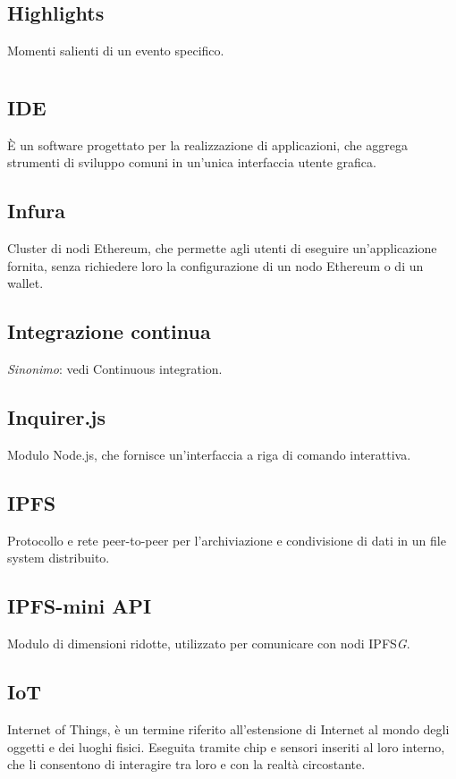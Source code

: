 	\subsection*{Highlights}
	Momenti salienti di un evento specifico. 
\pagebreak
\section[I]{}
	\subsection*{IDE}
	È un software progettato per la realizzazione di applicazioni, che aggrega strumenti di sviluppo comuni in un’unica interfaccia utente grafica.
	\subsection*{Infura}
	Cluster di nodi Ethereum, che permette agli utenti di eseguire un’applicazione fornita, senza richiedere loro la configurazione di un nodo Ethereum o di un wallet.  
	\subsection*{Integrazione continua}
	\emph{Sinonimo}: vedi Continuous integration.
	\subsection*{Inquirer.js}
	Modulo Node.js, che fornisce un'interfaccia a riga di comando interattiva.
	\subsection*{IPFS}
	Protocollo e rete peer-to-peer per l’archiviazione e condivisione di dati in un file system distribuito.
	\subsection*{IPFS-mini API}
	Modulo di dimensioni ridotte, utilizzato per comunicare con nodi IPFS{\textit{G}}. 
	\subsection*{IoT}
	Internet of Things, è un termine riferito all’estensione di Internet al mondo degli oggetti e dei luoghi fisici. Eseguita tramite chip e sensori inseriti al loro interno, che li consentono di interagire tra loro e con la realtà circostante.
